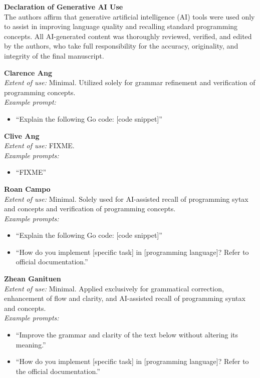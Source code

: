 \documentclass{article}
\begin{document}
\vfill
{\footnotesize
    \noindent\textbf{Declaration of Generative AI Use} \\
    The authors affirm that generative artificial intelligence (AI) tools were used only to assist in improving language quality and recalling standard programming concepts. All AI-generated content was thoroughly reviewed, verified, and edited by the authors, who take full responsibility for the accuracy, originality, and integrity of the final manuscript.

    \medskip
    \noindent\textbf{Clarence Ang} \\
    \emph{Extent of use:} Minimal. Utilized solely for grammar refinement and verification of programming concepts. \\
    \emph{Example prompt:}
    \begin{itemize}
        \item ``Explain the following Go code: [code snippet]''
    \end{itemize}

    \noindent\textbf{Clive Ang} \\
    \emph{Extent of use:} FIXME. \\
    \emph{Example prompts:}
    \begin{itemize}
        \item ``FIXME''
    \end{itemize}

    \noindent\textbf{Roan Campo} \\
    \emph{Extent of use:} Minimal. Solely used for AI-assisted recall of programming sytax and concepts and verification of programming concepts. \\
    \emph{Example prompts:}
    \begin{itemize}
        \item ``Explain the following Go code: [code snippet]''
        \item ``How do you implement [specific task] in [programming language]? Refer to official documentation.''
    \end{itemize}

    \noindent\textbf{Zhean Ganituen} \\
    \emph{Extent of use:} Minimal. Applied exclusively for grammatical correction, enhancement of flow and clarity, and AI-assisted recall of programming syntax and concepts. \\
    \emph{Example prompts:}
    \begin{itemize}
        \item ``Improve the grammar and clarity of the text below without altering its meaning.''
        \item ``How do you implement [specific task] in [programming language]? Refer to the official documentation.''
    \end{itemize}
    \par}
\end{document}
